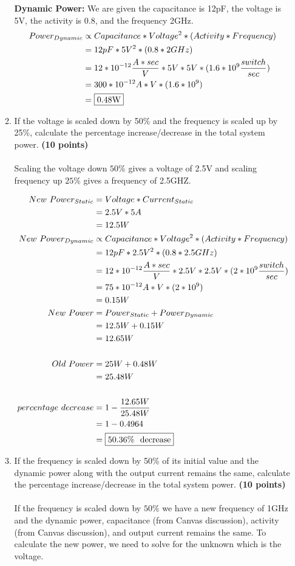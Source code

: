 \documentclass[a4paper, 15pt]{exam}
\begin{document}
\begin{enumerate}
\begin{enumerate}
   	\textbf{Dynamic Power:} We are given the capacitance is 12pF, the voltage is 5V, the activity is 0.8, and the frequency 2GHz.
   	\begin{align*} 
   			Power_{Dynamic} &\propto Capacitance * Voltage^2 * (Activity * Frequency) \\
   			&= 12pF * 5V^2 * (0.8 * 2GHz) \\
   			&= 12 * 10^{-12} \frac{A * sec}{V} * 5V * 5V * (1.6 * 10^9 \frac{switch}{sec})\\
   			&= 300 * 10^{-12} A * V * (1.6 * 10^9)\\
   			&= \fbox{0.48W}
   	\end{align*}
        \item If the voltage is scaled down by 50\% and the frequency is scaled up by 25\%, calculate the percentage increase/decrease in the total system power.   \textbf{(10 points)} \\ \\
     Scaling the voltage down $50\%$ gives a voltage of 2.5V and scaling frequency up $25\%$ gives a frequency of 2.5GHZ.
     
     \begin{align*}
   			New \ Power_{Static} &= Voltage * Current_{Static} \\
   			&= 2.5V * 5A \\
   			&= 12.5W \\
   			New \ Power_{Dynamic} &\propto Capacitance * Voltage^2 * (Activity * Frequency) \\
   			&= 12pF * 2.5V^2 * (0.8 * 2.5GHz) \\
   			&= 12 * 10^{-12} \frac{A * sec}{V} * 2.5V * 2.5V * (2 * 10^9 \frac{switch}{sec})\\
   			&= 75 * 10^{-12} A * V * (2 * 10^9)\\
   			&= 0.15W \\
   			New \ Power &= Power_{Static} + Power_{Dynamic} \\
   			&= 12.5W + 0.15W \\
   			&= 12.65W\\ \\
   			Old \ Power &= 25W + 0.48W \\
   			&= 25.48W \\ \\
   			percentage \ decrease &= 1 - \frac{12.65W}{25.48W} \\
   			&= 1 - 0.4964 \\
   			&= \fbox{50.36\% \ decrease}
   	\end{align*}
        \item If the frequency is scaled down by 50\% of its initial value and the dynamic power along with the output current remains the same, calculate the percentage increase/decrease in the total system power.  \textbf{(10 points)} \\ \\
      If the frequency is scaled down by $50\%$ we have a new frequency of 1GHz and the dynamic power, capacitance (from Canvas discussion), activity (from Canvas discussion), and output current remains the same. To calculate the new power, we need to solve for the unknown which is the voltage.
      

\end{enumerate}
\end{enumerate}
\end{document}
